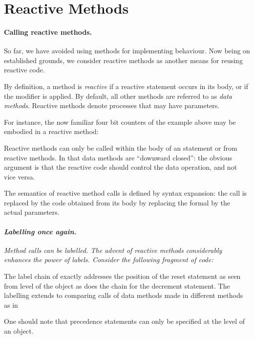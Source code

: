 \section{Reactive Methods}\label{methods}

\paragraph{Calling reactive methods.} So far, we have avoided using
methods for implementing behaviour.  Now being on established grounds,
we consider reactive methods as another means for reusing reactive 
code.

By definition, a method is \emph{reactive}
 if a reactive statement
occurs in its body, or if the modifier  is applied.  By
default, all other methods are referred to as \emph{data methods}. 
Reactive methods denote processes that may have parameters.

For instance, the now familiar four bit counters of the example above
may be embodied in a reactive method:


Reactive methods can only be called within the body of an  
statement or from reactive methods. 
In that data methods are ``downward closed'':  the
obvious argument is that the reactive code should control the data
operation, and not vice versa.

The semantics of reactive method calls is defined by syntax 
expansion: the call is replaced by the code obtained from its body by 
replacing the formal by the actual parameters.  

\paragraph{\textit{Labelling once again.}}

{\em
Method calls can be labelled. The advent of reactive methods 
considerably enhances the power of labels. Consider the following 
fragment of code:


The label chain of \emph{} exactly addresses the position of
the reset statement as seen from level of the object as does the
chain \emph{} for the decrement statement. The labelling 
extends to comparing calls of data methods made in different methods 
as in
 

One should note that precedence statements can only be specified at
the level of an object.
}

